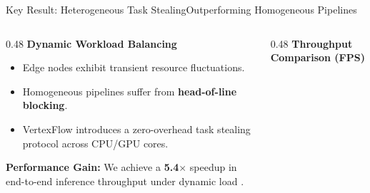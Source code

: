 \begin{frame}{Key Result: Heterogeneous Task Stealing}{Outperforming Homogeneous Pipelines}
  \begin{columns}[T]
    \begin{column}{0.48\textwidth}
      \textbf{Dynamic Workload Balancing}
      \begin{itemize}
        \item Edge nodes exhibit transient resource fluctuations.
        \item Homogeneous pipelines suffer from \textbf{head-of-line blocking}.
        \item VertexFlow introduces a zero-overhead task stealing protocol across CPU/GPU cores.
      \end{itemize}
      
      \vspace{0.3cm}
      \begin{highlightbox}
        \textbf{Performance Gain:} We achieve a \textbf{5.4$\times$} speedup in end-to-end inference throughput under dynamic load \cite{jenkins2026vertexflow}.
      \end{highlightbox}
    \end{column}
    
    \begin{column}{0.48\textwidth}
      \centering
      \textbf{Throughput Comparison (FPS)}
      \vspace{0.2cm}
      
\end{column}
\end{columns}
\end{frame}
